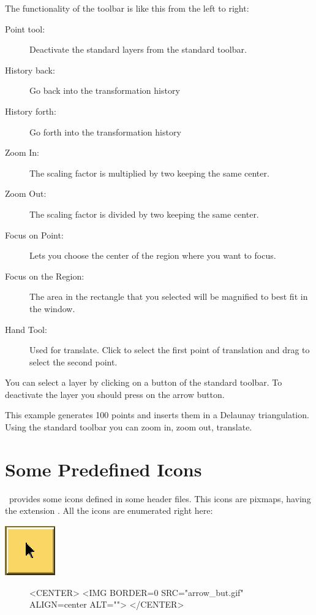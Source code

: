 The functionality of the toolbar is like this from the left to right:
\begin{description}
        \item[Point tool:] Deactivate the standard layers from the
standard toolbar.
	\item[History back:] Go back into the transformation history
	\item[History forth:] Go forth into the transformation history
        \item[Zoom In:] The scaling factor is multiplied by two
keeping the same center.
        \item[Zoom Out:] The scaling factor is divided by two keeping
the same center.
        \item[Focus on Point:] Lets you choose the center of the
region where you want to focus.
        \item[Focus on the Region:] The area in the rectangle that you selected will be magnified to best fit in the window.
        \item[Hand Tool:] Used for translate. Click to select the
first point of translation and drag to select the second point.
\end{description}

You can select a layer by clicking on a button of the standard
toolbar. To deactivate the layer you should press on the arrow button.

\ccExample
{}

This example generates 100 points and inserts them in a Delaunay
triangulation. Using the standard toolbar you can zoom in, zoom out,
translate.

\section{Some Predefined Icons}
\label{The predefined icons}

\cgal\ provides some icons defined in some header files. This icons are
pixmaps, having the extension . All the icons are enumerated right
here:

\begin{ccTexOnly}
\mbox{\includegraphics{arrow_but.eps}}
\end{ccTexOnly}
\begin{figure}[h]
\begin{ccHtmlOnly}
<CENTER>
<IMG BORDER=0 SRC="arrow_but.gif"  ALIGN=center  ALT="">
</CENTER>
\end{ccHtmlOnly}
\end{figure}


